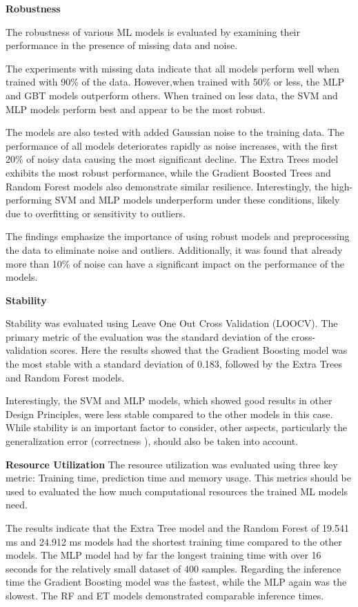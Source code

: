\textbf{Robustness}

The robustness of various ML models is evaluated by examining their performance in the presence of
missing data and noise.

The experiments with missing data indicate that all models perform well when trained with 90\% of the data.
However,when trained with 50\% or less, the MLP and GBT models outperform others.
When trained on less data, the SVM and MLP models perform best and appear to be the most robust.

The models are also tested with added Gaussian noise to the training data.
The performance of all models deteriorates rapidly as noise increases, with the first 20\% of noisy data causing the
most significant decline.
The Extra Trees model exhibits the most robust performance, while the Gradient Boosted Trees and Random Forest models
also demonstrate similar resilience.
Interestingly, the high-performing SVM and MLP models underperform under these conditions, likely due to overfitting
or sensitivity to outliers.

The findings emphasize the importance of using robust models and preprocessing the data to eliminate noise and
outliers.
Additionally, it was found that already more than 10\% of noise can have a significant impact on the
performance of the models.


\textbf{Stability}

Stability was evaluated using Leave One Out Cross Validation (LOOCV).
The primary metric of the evaluation was the standard deviation of the cross-validation scores.
Here the results showed that the Gradient Boosting model was the most stable with a standard deviation of 0.183,
followed by the Extra Trees and Random Forest models.

Interestingly, the SVM and MLP models, which showed good results in other Design Principles, were less stable
compared to the other models in this case.
While stability is an important factor to consider, other aspects, particularly the generalization error (correctness
), should also be taken into account.

\textbf{Resource Utilization}
The resource utilization was evaluated using three key metric: Training time, prediction time and memory usage.
This metrics should be used to evaluated the how much computational resources the trained \ac{ML} models need.

The results indicate that the Extra Tree model and the Random Forest of 19.541 ms and 24.912 ms models had the shortest
training time compared to the other models.
The MLP model had by far the longest training time with over 16 seconds for the relatively small dataset of 400 samples.
Regarding the inference time the Gradient Boosting model was the fastest, while the MLP again was the slowest.
The RF and ET models demonstrated comparable inference times.

